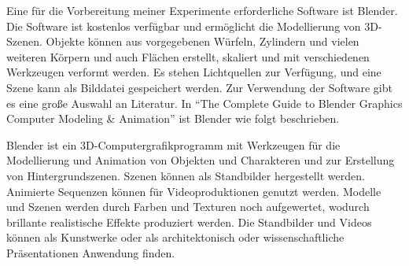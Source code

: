 Eine für die Vorbereitung meiner Experimente erforderliche Software ist Blender. Die Software ist kostenlos verfügbar und ermöglicht die Modellierung von 3D-Szenen. Objekte können aus vorgegebenen Würfeln, Zylindern und vielen weiteren Körpern und auch Flächen erstellt, skaliert und mit verschiedenen Werkzeugen verformt werden. Es stehen Lichtquellen zur Verfügung, und eine Szene kann als Bilddatei gespeichert werden. Zur Verwendung der Software gibt es eine große Auswahl an Literatur. In ``The Complete Guide to Blender Graphics Computer Modeling \&  Animation'' \cite{blain2020blender} ist Blender wie folgt beschrieben.

Blender ist ein 3D-Computergrafikprogramm mit Werkzeugen für die Modellierung und Animation von Objekten und Charakteren und zur Erstellung von Hintergrundszenen. Szenen können als Standbilder hergestellt werden. Animierte Sequenzen können für Videoproduktionen genutzt werden. Modelle und Szenen werden durch Farben und Texturen noch aufgewertet, wodurch brillante realistische Effekte produziert werden. Die Standbilder und Videos können als Kunstwerke oder als architektonisch oder wissenschaftliche Präsentationen Anwendung finden. \cite{blain2020blender}
